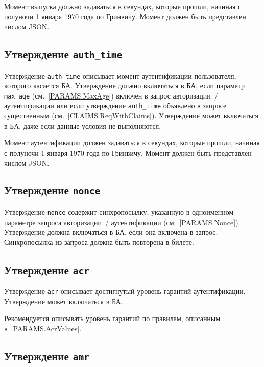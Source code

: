Момент выпуска должно задаваться в секундах, которые прошли, 
начиная с полуночи 1 января 1970 года по Гринвичу. Момент должен быть  
представлен числом JSON.  

\subsection{Утверждение \lstinline{auth_time}}\label{CLAIMS.AuthTime}

Утверждение \lstinline{auth_time} описывает момент аутентификации пользователя, 
которого касается БА. Утверждение должно включаться в БА, если параметр 
\lstinline{max_age} (см.~\ref{PARAMS.MaxAge}) включен в запрос 
авторизации~/ аутентификации или если утверждение \lstinline{auth_time} 
объявлено в запросе существенным (см.~\ref{CLAIMS.ReqWithClaims}).
%
Утверждение может включаться в БА, даже если данные условия не выполняются.

Момент аутентификации должен задаваться в секундах, которые прошли, 
начиная с полуночи 1 января 1970 года по Гринвичу. Момент должен быть 
представлен числом JSON. 

\subsection{Утверждение \lstinline{nonce}}\label{CLAIMS.Nonce}

Утверждение \lstinline{nonce} содержит синхропосылку, указанную в 
одноименном параметре запроса авторизации~/ аутентификации 
(см.~\ref{PARAMS.Nonce}).
%
Утверждение должна включаться в БА, если она включена в запрос.
%
Синхропосылка из запроса должна быть повторена в билете.


\subsection{Утверждение \lstinline{acr}}\label{CLAIMS.Acr}

Утверждение \lstinline{acr} описывает достигнутый уровень гарантий 
аутентификации. 
%
Утверждение может включаться в БА.

Рекомендуется описывать уровень гарантий по правилам, описанным 
в~\ref{PARAMS.AcrValues}.

\subsection{Утверждение \lstinline{amr}}\label{CLAIMS.Amr}

